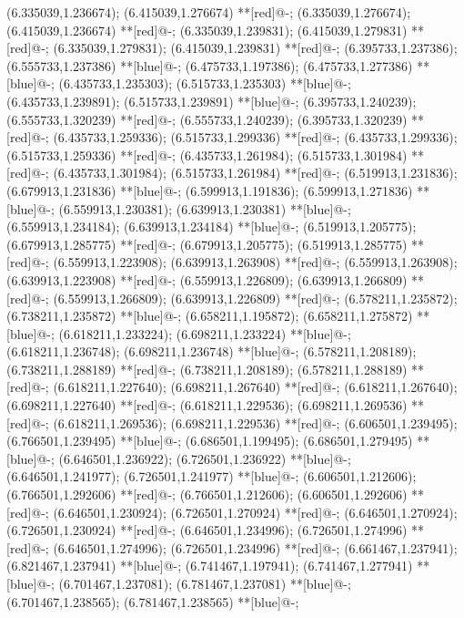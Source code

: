 (6.335039,1.236674); (6.415039,1.276674) **[red]@{-};
(6.335039,1.276674); (6.415039,1.236674) **[red]@{-};
(6.335039,1.239831); (6.415039,1.279831) **[red]@{-};
(6.335039,1.279831); (6.415039,1.239831) **[red]@{-};
(6.395733,1.237386); (6.555733,1.237386) **[blue]@{-};
(6.475733,1.197386); (6.475733,1.277386) **[blue]@{-};
(6.435733,1.235303); (6.515733,1.235303) **[blue]@{-};
(6.435733,1.239891); (6.515733,1.239891) **[blue]@{-};
(6.395733,1.240239); (6.555733,1.320239) **[red]@{-};
(6.555733,1.240239); (6.395733,1.320239) **[red]@{-};
(6.435733,1.259336); (6.515733,1.299336) **[red]@{-};
(6.435733,1.299336); (6.515733,1.259336) **[red]@{-};
(6.435733,1.261984); (6.515733,1.301984) **[red]@{-};
(6.435733,1.301984); (6.515733,1.261984) **[red]@{-};
(6.519913,1.231836); (6.679913,1.231836) **[blue]@{-};
(6.599913,1.191836); (6.599913,1.271836) **[blue]@{-};
(6.559913,1.230381); (6.639913,1.230381) **[blue]@{-};
(6.559913,1.234184); (6.639913,1.234184) **[blue]@{-};
(6.519913,1.205775); (6.679913,1.285775) **[red]@{-};
(6.679913,1.205775); (6.519913,1.285775) **[red]@{-};
(6.559913,1.223908); (6.639913,1.263908) **[red]@{-};
(6.559913,1.263908); (6.639913,1.223908) **[red]@{-};
(6.559913,1.226809); (6.639913,1.266809) **[red]@{-};
(6.559913,1.266809); (6.639913,1.226809) **[red]@{-};
(6.578211,1.235872); (6.738211,1.235872) **[blue]@{-};
(6.658211,1.195872); (6.658211,1.275872) **[blue]@{-};
(6.618211,1.233224); (6.698211,1.233224) **[blue]@{-};
(6.618211,1.236748); (6.698211,1.236748) **[blue]@{-};
(6.578211,1.208189); (6.738211,1.288189) **[red]@{-};
(6.738211,1.208189); (6.578211,1.288189) **[red]@{-};
(6.618211,1.227640); (6.698211,1.267640) **[red]@{-};
(6.618211,1.267640); (6.698211,1.227640) **[red]@{-};
(6.618211,1.229536); (6.698211,1.269536) **[red]@{-};
(6.618211,1.269536); (6.698211,1.229536) **[red]@{-};
(6.606501,1.239495); (6.766501,1.239495) **[blue]@{-};
(6.686501,1.199495); (6.686501,1.279495) **[blue]@{-};
(6.646501,1.236922); (6.726501,1.236922) **[blue]@{-};
(6.646501,1.241977); (6.726501,1.241977) **[blue]@{-};
(6.606501,1.212606); (6.766501,1.292606) **[red]@{-};
(6.766501,1.212606); (6.606501,1.292606) **[red]@{-};
(6.646501,1.230924); (6.726501,1.270924) **[red]@{-};
(6.646501,1.270924); (6.726501,1.230924) **[red]@{-};
(6.646501,1.234996); (6.726501,1.274996) **[red]@{-};
(6.646501,1.274996); (6.726501,1.234996) **[red]@{-};
(6.661467,1.237941); (6.821467,1.237941) **[blue]@{-};
(6.741467,1.197941); (6.741467,1.277941) **[blue]@{-};
(6.701467,1.237081); (6.781467,1.237081) **[blue]@{-};
(6.701467,1.238565); (6.781467,1.238565) **[blue]@{-};
